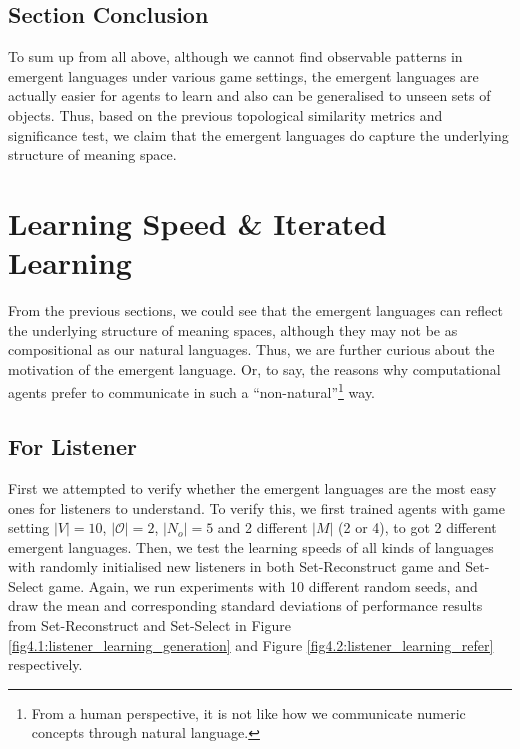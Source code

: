 \subsection{Section Conclusion}
\label{ssec4.2.5:sec_conclusion}

To sum up from all above, although we cannot find observable patterns in emergent languages under various game settings, the emergent languages are actually easier for agents to learn and also can be generalised to unseen sets of objects. Thus, based on the previous topological similarity metrics and significance test, we claim that the emergent languages do capture the underlying structure of meaning space.


\section{Learning Speed \& Iterated Learning}
\label{sec4.3:learning_speed}

From the previous sections, we could see that the emergent languages can reflect the underlying structure of meaning spaces, although they may not be as compositional as our natural languages. Thus, we are further curious about the motivation of the emergent language. Or, to say, the reasons why computational agents prefer to communicate in such a ``non-natural''\footnote{From a human perspective, it is not like how we communicate numeric concepts through natural language.} way.

\subsection{For Listener}
\label{ssec4.3.1:learning_listener}

First we attempted to verify whether the emergent languages are the most easy ones for listeners to understand. To verify this, we first trained agents with game setting $|V|=10$, $|\mathcal{O}|=2$, $|N_{o}|=5$ and 2 different $|M|$ (2 or 4), to got 2 different emergent languages. Then, we test the learning speeds of all kinds of languages with randomly initialised new listeners in both Set-Reconstruct game and Set-Select game. Again, we run experiments with 10 different random seeds, and draw the mean and corresponding standard deviations of performance results from Set-Reconstruct and Set-Select in Figure \ref{fig4.1:listener_learning_generation} and Figure \ref{fig4.2:listener_learning_refer} respectively.

